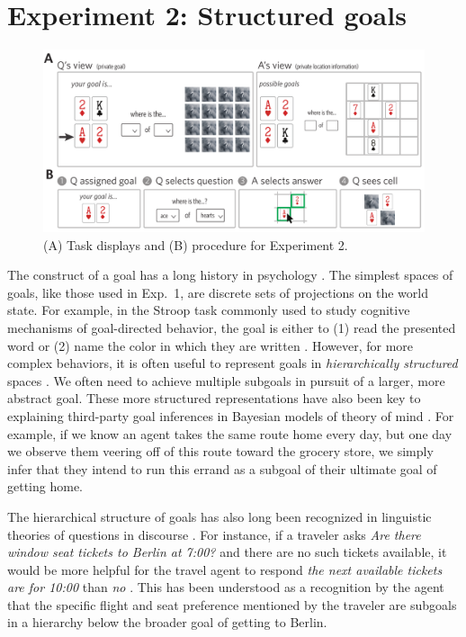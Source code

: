 \documentclass[11pt, floatsintext]{apa6}
\begin{document}
\section{Experiment 2: Structured goals}
\begin{figure}[th!]
\begin{center}
\includegraphics[scale = .9]{Exp2/task.pdf}
\end{center}
\caption{(A) Task displays and (B) procedure for Experiment 2.}
\label{fig:exp2task}
\end{figure}

The construct of a goal has a long history in psychology \cite{miller1960plans, Schank:1977hh, austin1996goal}.
The simplest spaces of goals, like those used in Exp.~1, are discrete sets of projections on the world state.
For example, in the Stroop task commonly used to study cognitive mechanisms of goal-directed behavior, the goal is either to (1) read the presented word or (2) name the color in which they are written \cite{miller2001integrative}.
However, for more complex behaviors, it is often useful to represent goals in \emph{hierarchically structured} spaces \cite{badre2008cognitive,botvinick2008hierarchical}. 
We often need to achieve multiple subgoals in pursuit of a larger, more abstract goal. 
These more structured representations have also been key to explaining third-party goal inferences in Bayesian models of theory of mind \cite{BakerSaxeTenenbaum09_ActionUnderstandingInversePlanning}. 
For example, if we know an agent takes the same route home every day, but one day we observe them veering off of this route toward the grocery store, we simply infer that they intend to run this errand as a subgoal of their ultimate goal of getting home. 

The hierarchical structure of goals has also long been recognized in linguistic theories of questions in discourse  \cite{Kuppevelt95_TopicalityDiscourse,Roberts96_InformationStructureDiscourse,Buring03_DtreesBeansBaccents,Groenendijk99_LogicOfInterrogation,rojas2014discourse}.
For instance, if a traveler asks \emph{Are there window seat tickets to Berlin at 7:00?} and there are no such tickets available, it would be more helpful for the travel agent to respond \emph{the next available tickets are for 10:00} than \emph{no} \cite{rojas2013roadsigns}.
This has been understood as a recognition by the agent that the specific flight and seat preference mentioned by the traveler are subgoals in a hierarchy below the broader goal of getting to Berlin. 
\end{document}
